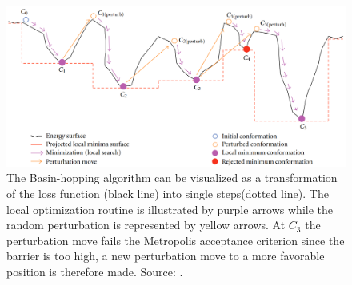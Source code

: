 \begin{figure}
    \centering
    \includegraphics[scale=0.3]{images/7_appendix/bh.png}
    \caption{The Basin-hopping algorithm can be visualized as a transformation of the loss function (black line) into single steps(dotted line). 
    The local optimization routine is illustrated by purple arrows while the random perturbation is represented by yellow arrows. At $C_3$ the perturbation move fails the Metropolis acceptance criterion since the barrier is too high, a new perturbation move to a more favorable position is therefore made. Source: \cite{Olson2012}.}
    \label{fig:Basin-hopping}
\end{figure}